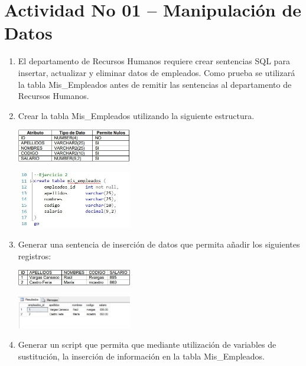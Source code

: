 \section{Actividad No 01 – Manipulaci\'on de Datos} 

\begin{enumerate}[1.]
	\item El departamento de Recursos Humanos requiere crear sentencias SQL para insertar, actualizar y eliminar datos de empleados. Como prueba se utilizará la tabla Mis\_Empleados antes de remitir las sentencias al departamento de Recursos Humanos.

	\item Crear la tabla Mis\_Empleados utilizando la siguiente estructura.
	\begin{center}
	\includegraphics[width=5cm]{./Imagenes/imagen0102} 
	\end{center}
	\begin{center}
	\includegraphics[width=5cm]{./Imagenes/img2} 
	\end{center}
	\item Generar una sentencia de inserción de datos que permita añadir los siguientes registros:
	\begin{center}
	\includegraphics[width=5cm]{./Imagenes/imagen0103} 
	\end{center}
	\begin{center}
	\includegraphics[width=5cm]{./Imagenes/img3} 
	\end{center}
	\item Generar un script que permita que mediante utilización de variables de sustitución, la inserción de información en la tabla Mis\_Empleados.
	\begin{center}

\end{center}
\end{enumerate}
